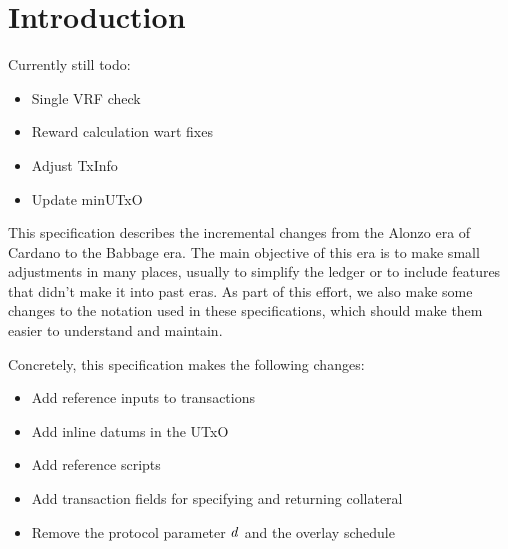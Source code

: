 \section{Introduction}

Currently still todo:

\begin{itemize}
\item Single VRF check
\item Reward calculation wart fixes
\item Adjust TxInfo
\item Update minUTxO
\end{itemize}

This specification describes the incremental changes from the Alonzo
era of Cardano to the Babbage era. The main objective of this era is
to make small adjustments in many places, usually to simplify the
ledger or to include features that didn't make it into past eras. As
part of this effort, we also make some changes to the notation used in
these specifications, which should make them easier to understand and
maintain.

Concretely, this specification makes the following changes:
\begin{itemize}
\item Add reference inputs to transactions
\item Add inline datums in the UTxO
\item Add reference scripts
\item Add transaction fields for specifying and returning collateral
\item Remove the protocol parameter $\mathit{d}$ and the overlay schedule
\end{itemize}
